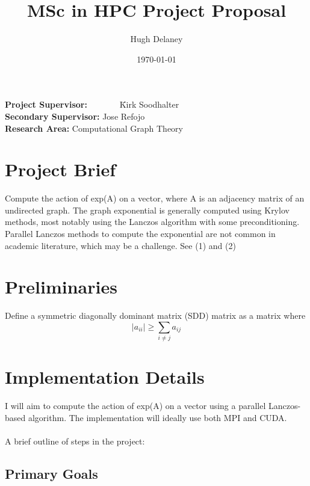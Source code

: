 \documentclass[a4paper, fleqn]{article}
\date{\today}
\author{Hugh Delaney}
\title{MSc in HPC Project Proposal}
\begin{document}
\maketitle
\begin{tabbing}
        \textbf{Project Supervisor:}~~~~~~~ \=Kirk Soodhalter \\
        \textbf{Secondary Supervisor:} \>Jose Refojo \\
        \textbf{Research Area:}  \> Computational Graph Theory \\
\end{tabbing}

\section*{Project Brief}%
\label{sec:project_brief}
Compute the action of exp(A) on a vector, where A is an  adjacency matrix of an undirected graph. The graph exponential is generally computed using Krylov methods, most notably using the Lanczos algorithm with some preconditioning. Parallel Lanczos methods to compute the exponential are not common in academic literature, which may be a challenge. See (1) and (2) 

\section*{Preliminaries}%
\label{sec:preliminaries}

Define a symmetric diagonally dominant matrix (SDD) matrix as a matrix where 
\[  |a_{ii}| \ge \sum_{i\neq j} a_{ij} \]

\section*{Implementation Details}%
\label{sec:project_brief}

I will aim to compute the action of exp(A) on a vector using a parallel Lanczos-based algorithm. The implementation will ideally use both MPI and CUDA.
\\ \\ A brief outline of steps in the project:

\subsection*{Primary Goals}%
\label{sub:primary_goals}
\end{document}
